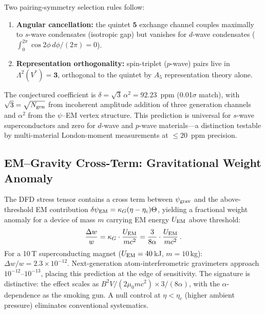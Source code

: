 Two pairing-symmetry selection rules follow:
\begin{enumerate}
\item \textbf{Angular cancellation:} the quintet $\mathbf{5}$
  exchange channel couples maximally to $s$-wave condensates
  (isotropic gap) but vanishes for $d$-wave condensates
  ($\int_0^{2\pi} \cos 2\phi\,d\phi/(2\pi) = 0$).
\item \textbf{Representation orthogonality:} spin-triplet ($p$-wave)
  pairs live in $\Lambda^2(V^*) = \mathbf{3}$, orthogonal to the
  quintet by $A_5$ representation theory alone.
\end{enumerate}
The conjectured coefficient is
$\delta = \sqrt{3}\,\alpha^2 = 92.23$~ppm (0.01$\sigma$ match),
with $\sqrt{3} = \sqrt{N_{\rm gen}}$ from incoherent amplitude
addition of three generation channels and $\alpha^2$ from the
$\psi$--EM vertex structure.  This prediction is universal for
$s$-wave superconductors and zero for $d$-wave and $p$-wave
materials---a distinction testable by multi-material London-moment
measurements at $\leq 20$~ppm precision.

\subsection{EM--Gravity Cross-Term: Gravitational Weight Anomaly}\label{app:weight-anomaly}

The DFD stress tensor contains a cross term between $\psi_{\rm grav}$
and the above-threshold EM contribution $\delta\psi_{\rm EM} =
\kappa_G(\eta - \eta_c)\Theta$, yielding a fractional weight anomaly
for a device of mass $m$ carrying EM energy $U_{\rm EM}$ above
threshold:
\begin{equation}\label{eq:weight-anomaly}
\frac{\Delta w}{w} = \kappa_G \cdot \frac{U_{\rm EM}}{mc^2}
= \frac{3}{8\alpha} \cdot \frac{U_{\rm EM}}{mc^2}\,.
\end{equation}
For a 10\,T superconducting magnet ($U_{\rm EM} = 40$\,kJ,
$m = 10$\,kg): $\Delta w/w = 2.3 \times 10^{-12}$.
Next-generation atom-interferometric gravimeters approach
$10^{-12}$--$10^{-13}$, placing this prediction at the edge of
sensitivity.  The signature is distinctive: the effect scales as
$B^2 V/(2\mu_0 mc^2) \times 3/(8\alpha)$, with the $\alpha$-dependence
as the smoking gun.  A null control at $\eta < \eta_c$ (higher
ambient pressure) eliminates conventional systematics.

